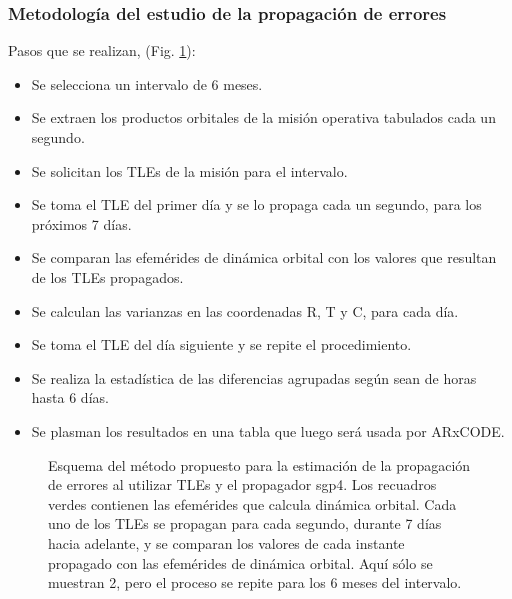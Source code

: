{\subsubsection*{Metodolog\'ia del estudio de la propagaci\'on de errores}\label{subsec:errorProp}
Pasos que se realizan, (Fig. \ref{fig:metodotabla}):
\begin{itemize}
\itemsep0em
\item Se selecciona un intervalo de 6 meses.
\item Se extraen los productos orbitales de la misi\'on operativa tabulados cada un segundo.
\item Se solicitan los TLEs de la misi\'on para el intervalo.
\item Se toma el TLE del primer d\'ia y se lo propaga cada un segundo, para los pr\'oximos 7 d\'ias.
\item Se comparan las efem\'erides de din\'amica orbital con los valores que resultan de los TLEs propagados.
\item Se calculan las varianzas en las coordenadas R, T y C, para cada d\'ia.
\item Se toma el TLE del d\'ia siguiente y se repite el procedimiento.
\item Se realiza la estad\'istica  de las diferencias agrupadas seg\'un sean de horas hasta 6 d\'ias.
\item Se plasman los resultados en una tabla que luego ser\'a usada por ARxCODE.
\end{itemize}

\begin{figure}[!h]
\centering
{}
\caption[Descripci\'on del m\'etodo propuesto para la propagaci\'on de errores]{Esquema del m\'etodo propuesto para la estimaci\'on de la propagaci\'on de errores al utilizar TLEs y el propagador sgp4. Los recuadros verdes contienen las efem\'erides que calcula din\'amica orbital. Cada uno de los TLEs se propagan para cada segundo, durante 7 d\'ias hacia adelante, y se comparan los valores de cada instante propagado con las efem\'erides de din\'amica orbital. Aqu\'i s\'olo se muestran 2, pero el proceso se repite para los 6 meses del intervalo.}
\label{fig:metodotabla}
\end{figure}

}
